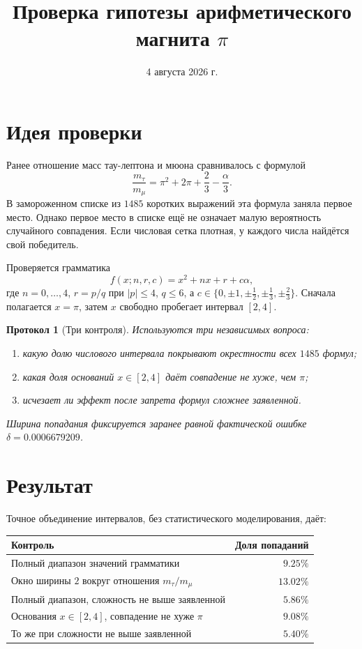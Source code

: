 \documentclass[12pt,a4paper]{article}
\title{Проверка гипотезы арифметического магнита $\pi$}
\author{}
\date{4 августа 2026 г.}
\newtheorem{protocol}{Протокол}
\begin{document}
\maketitle

\section{Идея проверки}

Ранее отношение масс тау-лептона и мюона сравнивалось с формулой
\begin{equation}
 \frac{m_\tau}{m_\mu}
 =\pi^2+2\pi+\frac23-\frac{\alpha}{3}.
\end{equation}
В замороженном списке из $1485$ коротких выражений эта формула заняла первое
место. Однако первое место в списке ещё не означает малую вероятность
случайного совпадения. Если числовая сетка плотная, у каждого числа найдётся
свой победитель.

Проверяется грамматика
\begin{equation}
 f(x;n,r,c)=x^2+nx+r+c\alpha,
\end{equation}
где $n=0,\ldots,4$, $r=p/q$ при $|p|\leq4$, $q\leq6$, а
$c\in\{0,\pm1,\pm\tfrac12,\pm\tfrac13,\pm\tfrac23\}$. Сначала полагается
$x=\pi$, затем $x$ свободно пробегает интервал $[2,4]$.

\begin{protocol}[Три контроля]
Используются три независимых вопроса:
\begin{enumerate}
 \item какую долю числового интервала покрывают окрестности всех $1485$ формул;
 \item какая доля оснований $x\in[2,4]$ даёт совпадение не хуже, чем $\pi$;
 \item исчезает ли эффект после запрета формул сложнее заявленной.
\end{enumerate}
Ширина попадания фиксируется заранее равной фактической ошибке
$\delta=0.0006679209$.
\end{protocol}

\section{Результат}

Точное объединение интервалов, без статистического моделирования, даёт:
\begin{center}
\begin{tabular}{>{\raggedright\arraybackslash}p{}r}
\toprule
Контроль & Доля попаданий \\
\midrule
Полный диапазон значений грамматики & $9.25\%$ \\
Окно ширины $2$ вокруг отношения $m_\tau/m_\mu$ & $13.02\%$ \\
Полный диапазон, сложность не выше заявленной & $5.86\%$ \\
Основания $x\in[2,4]$, совпадение не хуже $\pi$ & $9.08\%$ \\
То же при сложности не выше заявленной & $5.40\%$ \\
\bottomrule
\end{tabular}
\end{center}
\end{document}
